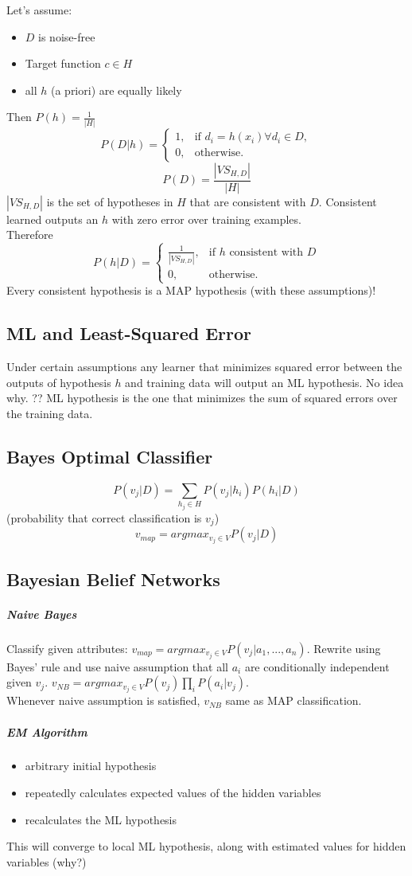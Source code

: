 \documentclass[11pt]{article}
\begin{document}
Let's assume:
\begin{itemize}
\item $D$ is noise-free
\item Target function $c \in H$
\item all $h$ (a priori) are equally likely
\end{itemize}
Then $P(h) = \frac1{|H|}$\\
$$P(D|h) =
    \begin{cases}
            1, &         \text{if } d_i =h(x_i) \forall d_i \in D,\\
            0, &         \text{otherwise}.
    \end{cases}
$$
$$P(D) = \frac{|VS_{H,D}|}{|H|}$$ $|VS_{H,D}|$ is the set of hypotheses in $H$ that are consistent with $D$. Consistent learned outputs an $h$ with zero error over training examples.\\
Therefore $$P(h|D) = \begin{cases}
            \frac1{|VS_{H,D}|}, &         \text{if $h$ consistent with $D$}\\
            0, &         \text{otherwise}.
    \end{cases}
$$
Every consistent hypothesis is a MAP hypothesis (with these assumptions)!

\subsection{ML and Least-Squared Error}
Under certain assumptions any learner that minimizes squared error between the outputs of hypothesis $h$ and training data will output an ML hypothesis. No idea why. ?? ML hypothesis is the one that minimizes the sum of squared errors over the training data.

\subsection{Bayes Optimal Classifier}
$$P(v_j |D) = \sum_{h_j \in H}{P(v_j|h_i) P(h_i|D)}$$ (probability that correct classification is $v_j$)\\
$$v_{map} = argmax_{v_j \in V} P(v_j|D)$$

\subsection{Bayesian Belief Networks}
\subparagraph{Naive Bayes} Classify given attributes: $v_{map} = argmax_{v_j \in V} P(v_j|a_1,...,a_n)$. Rewrite using Bayes' rule and use naive assumption that all $a_i$ are conditionally independent given $v_j$. $v_{NB} = argmax_{v_j \in V} P(v_j) \prod_{i}{P(a_i|v_j)}$.\\
Whenever naive assumption is satisfied, $v_{NB}$ same as MAP classification.
\subparagraph{EM Algorithm}
\begin{itemize}
\item arbitrary initial hypothesis
\item repeatedly calculates expected values of the hidden variables
\item recalculates the ML hypothesis
\end{itemize}
This will converge to local ML hypothesis, along with estimated values for hidden variables (why?)
\end{document}
